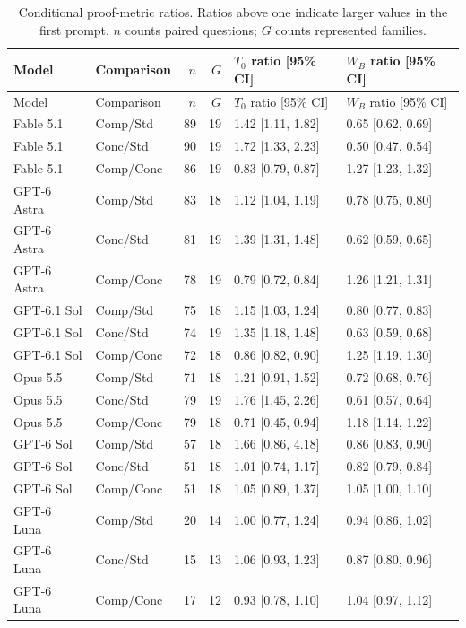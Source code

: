 \documentclass[11pt]{article}
\begin{document}
\begin{longtable}{llrrll}
\caption{Conditional proof-metric ratios. Ratios above one indicate larger values in the first prompt. $n$ counts paired questions; $G$ counts represented families.}\label{tab:all-metrics}\\
\toprule Model & Comparison & $n$ & $G$ & $T_0$ ratio [95\% CI] & $W_B$ ratio [95\% CI]\\\midrule\endfirsthead
\toprule Model & Comparison & $n$ & $G$ & $T_0$ ratio [95\% CI] & $W_B$ ratio [95\% CI]\\\midrule\endhead
Fable 5.1 & Comp/Std & 89 & 19 & 1.42 [1.11, 1.82] & 0.65 [0.62, 0.69] \\
Fable 5.1 & Conc/Std & 90 & 19 & 1.72 [1.33, 2.23] & 0.50 [0.47, 0.54] \\
Fable 5.1 & Comp/Conc & 86 & 19 & 0.83 [0.79, 0.87] & 1.27 [1.23, 1.32] \\
GPT-6 Astra & Comp/Std & 83 & 18 & 1.12 [1.04, 1.19] & 0.78 [0.75, 0.80] \\
GPT-6 Astra & Conc/Std & 81 & 19 & 1.39 [1.31, 1.48] & 0.62 [0.59, 0.65] \\
GPT-6 Astra & Comp/Conc & 78 & 19 & 0.79 [0.72, 0.84] & 1.26 [1.21, 1.31] \\
GPT-6.1 Sol & Comp/Std & 75 & 18 & 1.15 [1.03, 1.24] & 0.80 [0.77, 0.83] \\
GPT-6.1 Sol & Conc/Std & 74 & 19 & 1.35 [1.18, 1.48] & 0.63 [0.59, 0.68] \\
GPT-6.1 Sol & Comp/Conc & 72 & 18 & 0.86 [0.82, 0.90] & 1.25 [1.19, 1.30] \\
Opus 5.5 & Comp/Std & 71 & 18 & 1.21 [0.91, 1.52] & 0.72 [0.68, 0.76] \\
Opus 5.5 & Conc/Std & 79 & 19 & 1.76 [1.45, 2.26] & 0.61 [0.57, 0.64] \\
Opus 5.5 & Comp/Conc & 79 & 18 & 0.71 [0.45, 0.94] & 1.18 [1.14, 1.22] \\
GPT-6 Sol & Comp/Std & 57 & 18 & 1.66 [0.86, 4.18] & 0.86 [0.83, 0.90] \\
GPT-6 Sol & Conc/Std & 51 & 18 & 1.01 [0.74, 1.17] & 0.82 [0.79, 0.84] \\
GPT-6 Sol & Comp/Conc & 51 & 18 & 1.05 [0.89, 1.37] & 1.05 [1.00, 1.10] \\
GPT-6 Luna & Comp/Std & 20 & 14 & 1.00 [0.77, 1.24] & 0.94 [0.86, 1.02] \\
GPT-6 Luna & Conc/Std & 15 & 13 & 1.06 [0.93, 1.23] & 0.87 [0.80, 0.96] \\
GPT-6 Luna & Comp/Conc & 17 & 12 & 0.93 [0.78, 1.10] & 1.04 [0.97, 1.12] \\

\end{longtable}
\end{document}
